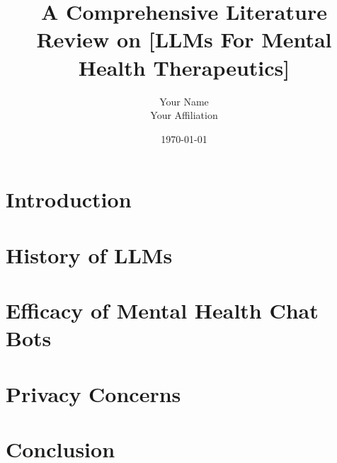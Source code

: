 \documentclass[12pt, letterpaper]{article} %
\title{A Comprehensive Literature Review on [LLMs For ​Mental Health Therapeutics​]}
\author{Your Name\\Your Affiliation}
\date{\today}
\begin{document}
\maketitle  %

\begin{abstract}
\end{abstract}

\tableofcontents %

\section{Introduction}

\section{History of LLMs}
     

\section{Efficacy of Mental Health Chat Bots}
     

\section{Privacy Concerns}

\section{Conclusion}

\end{document}
